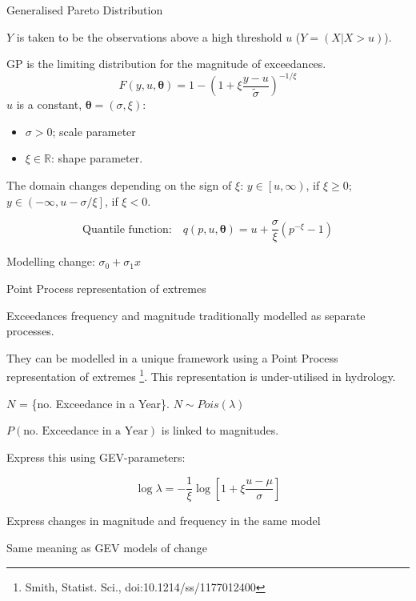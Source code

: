 \documentclass[
  10pt,
  ignorenonframetext,
  compress]{beamer}
\providecommand{\tightlist}{%
  \setlength{\itemsep}{0pt}\setlength{\parskip}{0pt}}
\begin{document}
\begin{frame}{Generalised Pareto Distribution}
\protect\hypertarget{generalised-pareto-distribution}{}

\(Y\) is taken to be the observations above a high threshold \(u\)
(\(Y = (X|X>u)\)).

GP is the limiting distribution for the magnitude of exceedances.
\[F(y, u, \boldsymbol \theta) =  1- \left( 1 + \xi \frac{y-u}{\tilde{\sigma}} \right) ^{-1/\xi}\]
\(u\) is a constant, \(\boldsymbol\theta = (\sigma, \xi)\):

\begin{itemize}
\tightlist
\item
  \(\sigma > 0\); scale parameter
\item
  \(\xi \in \mathbb{R}\): shape parameter.
\end{itemize}

The domain changes depending on the sign of \(\xi\):
\(y \in \left[u, \infty \right)\), if \(\xi \geq 0\);
\(y \in \left( -\infty, u -\sigma/\xi \right]\), if \(\xi < 0\).

\[ \text{Quantile function:}\quad  q(p, u, \boldsymbol \theta) = u + \frac{\sigma}{\xi} (p^{-\xi} - 1) \]

\pause

Modelling change: \(\sigma_0 + \sigma_1 x\)

\end{frame}

\begin{frame}{Point Process representation of extremes}
\protect\hypertarget{point-process-representation-of-extremes}{}

Exceedances frequency and magnitude traditionally modelled as separate
processes.

They can be modelled in a unique framework using a Point Process
representation of extremes
\footnote{Smith, Statist. Sci., doi:10.1214/ss/1177012400}. \pause This
representation is under-utilised in hydrology.

\(N\) = \{no. Exceedance in a Year\}. \(N \sim Pois(\lambda)\)

\(P(\text{no. Exceedance in a Year})\) is linked to magnitudes.

\pause

Express this using GEV-parameters:

\[\log \lambda = -\frac{1}{\xi} \log\left[1+\xi \frac{u-\mu}{\sigma} \right]\]

\pause

Express changes in magnitude and frequency in the same model

Same meaning as GEV models of change

\end{frame}
\end{document}

